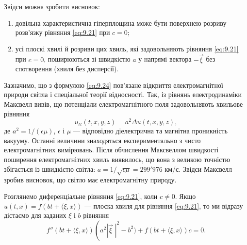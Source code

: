 Звідси можна зробити висновок:
\begin{enumerate}
    \item довільна характеристична гіперплощина може бути поверхнею розриву розв'язку рівняння \eqref{eq:9.21} при $c = 0$;
    \item усі плоскі хвилі й розриви цих хвиль, які задовольняють рівняння \eqref{eq:9.21} при $c = 0$, поширюються зі швидкістю $a$ у напрямі вектора $- \vec \xi$ без спотворення (хвиля без дисперсії).
\end{enumerate}

Зазначимо, що з формулою \eqref{eq:9.24} пов'язане відкриття електромагнітної природи світла і спеціальної теорії відносності. Так, із рівнянь електродинаміки Максвелл вивів, що потенціали електромагнітного поля задовольняють хвильове рівняння 
\begin{equation}
    u_{tt}(t, x, y, z) = a^2 \Delta u(t, x, y, z),
\end{equation}
де $a^2 = 1 / (\epsilon \mu)$, $\epsilon$ і $\mu$ --- відповідно діелектрична та магнітна проникність вакууму. Останні величини знаходяться експериментально з чисто електромагнітних вимірювань. Після обчислення Максвеллом швидкості поширення електромагнітних хвиль виявилось, що вона з великою точністю збігається із швидкістю світла: $a = 1 / \sqrt{\epsilon \mu} = 299'976$ км/с. Звідси Максвелл зробив висновок, що світло має електромагнітну природу. \medskip

Розглянемо диференціальне рівняння \eqref{eq:9.21}, коли $c \ne 0$. Якщо $u(t, x) = f (b t + \langle \xi, x \rangle)$ --- плоска хвиля для рівняння \eqref{eq:9.21}, то ми відразу дістаємо для заданих $\xi$ і $b$ рівняння 
\begin{equation}
    \label{eq:9.26}
    f''(bt+\langle \xi, x \rangle) \left( a^2 \left| \vec \xi \; \right|^2 - b^2) + f(bt + \langle \xi, x \rangle) c = 0.
\end{equation}

